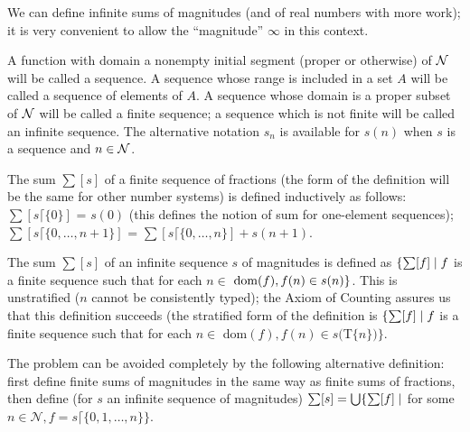 We can define infinite sums of magnitudes
(and of real numbers with more work); it is very convenient
to allow the ``magnitude'' $\infty$
in this context.

\begin{definition}
 A function with domain a nonempty initial
 segment (proper or otherwise) of $\cal N$ will be called a
 {\upshape sequence}.
 A sequence whose range is included in a set $A$ will be called a
 {\upshape sequence of elements of $A$}.  A sequence whose domain is a proper
 subset of $\cal N$ will be called a
 {\upshape finite sequence}; a sequence which is not
 finite will be
 called an {\upshape infinite sequence}.  The
 alternative notation $s_n$ is available for $s(n)$ when $s$ is a sequence
and $n \in {\cal N}$.
\end{definition}

\begin{definition}
 The sum $\sum[s]$ of a finite sequence of fractions
(the form of the definition will be the same for other number systems)
is defined inductively as follows: $\sum[s\lceil\{0\}]$ = $s(0)$ (this
defines the notion of sum for one-element sequences);
$\sum[s\lceil\{0,\ldots,n+1\}]$ = $\sum[s\lceil\{0,\ldots,n\}] +
s(n+1)$.
\end{definition}

\begin{definition}
 The sum $\sum[s]$ of an infinite sequence $s$ of
 magnitudes is defined 
 as $\{\sum[f] \mid f$ is a finite sequence such that for
 each $n \in$ 
 $\mathop{\mathrm{dom}}(f),f(n) \in s(n)\}$.  This is unstratified
 ($n$ cannot be consistently typed); the Axiom
 of Counting assures us that this definition succeeds
 (the stratified form of the definition is $\{\sum[f]
 \mid f$ is a finite sequence such that for each $n \in$ dom$(f),f(n)
 \in s($T$\{n\})\}$.

 The problem can be avoided completely by the following alternative
 definition: first define finite sums of magnitudes in the
 same way as finite sums of fractions, then define (for $s$ an
 infinite sequence of magnitudes) $\sum[s]=\bigcup \{\sum [f]
 \mid $ for some $ n \in {\mathcal N}, f = s\lceil
 \{0,1,\ldots, n\}\}$.
\end{definition}


